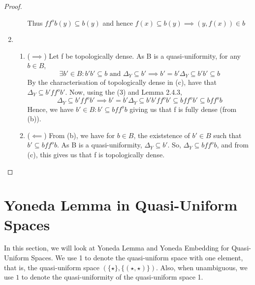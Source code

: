 \documentclass[18pt,a4paper]{article}
\theoremstyle{definition}
\begin{document}
\begin{proof}
\begin{enumerate}[label=(\alph*)]
\begin{enumerate}[label=(\roman*)]
				Thus $f f^o b(y) \subseteq b(y)$ and hence $f(x) \subseteq b(y) \implies
				(y,f(x)) \in b$
		\end{enumerate}
	\item \begin{enumerate}[label=(\roman*)]
		\item
			($\implies $) Let f be topologically dense. As B is a quasi-uniformity, for any $b \in B$,
			\begin{equation}\exists b' \in B : b'b' \subseteq b \text{ and } \Delta_Y \subseteq b'
				\implies b'=b'\Delta_Y \subseteq b'b' \subseteq b
			\end{equation}
			By the characterisation of topologically dense in (c), have that $\Delta_Y \subseteq b'f f^o b'$.
			Now, using the (3) and Lemma 2.4.3,
			\[ \Delta_Y \subseteq b'f f^o b' \implies b'=b'\Delta_Y \subseteq b'b'f f^o b' \subseteq bf f^o b'
			\subseteq bf f^o b\]
			Hence, we have $b'\in B : b' \subseteq bf f^o b$ giving us that f is fully dense (from (b)).
		\item ($\impliedby$) From (b), we have for $b \in B$, the existstence of $b' \in B$ such that $
			b' \subseteq bf f^o b$. As B is a quasi-uniformity, $\Delta_Y \subseteq b'$. So,
			$\Delta_Y \subseteq bf f^o b$, and from (c), this gives us that f is topologically dense. \qedhere
	\end{enumerate}
\end{enumerate}
\end{proof}
\section{Yoneda Lemma in Quasi-Uniform Spaces}

In this section, we will look at Yoneda Lemma and Yoneda Embedding for Quasi-Uniform Spaces.
We use 1 to denote the quasi-uniform space with one element, that is, the quasi-uniform space
$(\{\star\},\{(\star,\star)\})$. Also, when unambiguous, we use $1$ to denote the quasi-uniformity
of the quasi-uniform space 1.
\end{document}
